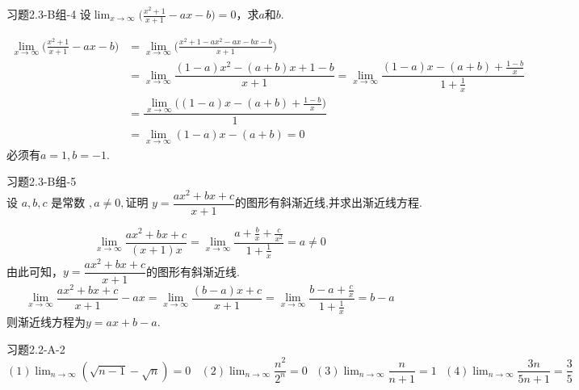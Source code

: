 \begin{example}{习题2.3-B组-4}{}
    设$\displaystyle\lim_{x\to \infty}\bigg(\frac{x^2+1}{x+1}-ax-b\bigg)=0$，求$a$和$b$.
\end{example}
\begin{solution}
    \begin{align*}\displaystyle\lim_{x\to \infty}\bigg(\frac{x^2+1}{x+1}-ax-b\bigg)&=\lim_{x\to \infty}\bigg(\frac{x^2+1-ax^2-ax-bx-b}{x+1}\bigg)\\&=\lim_{x\to \infty}\dfrac{(1-a)x^2-(a+b)x+1-b}{x+1}=\lim_{x\to \infty}\dfrac{(1-a)x-(a+b)+\frac{1-b}{x}}{1+\frac{1}{x}}\\&=\dfrac{\lim_{x\to \infty}\bigg((1-a)x-(a+b)+\frac{1-b}{x}\bigg)}{1}\\&=\lim_{x\to \infty}(1-a)x-(a+b)=0\end{align*}
    必须有$a=1,b=-1$.
\end{solution}
\begin{example}{习题2.3-B组-5}{}
    $\text{设 }a,b,c\text{ 是常数 },a\neq0,\text{证明 }y=\dfrac{ax^{2}+bx+c}{x+1}\text{的图形有斜渐近线,并求出渐近线方程}.$
\end{example}
\begin{solution}
    \[\lim_{x\to \infty}\dfrac{ax^{2}+bx+c}{(x+1)x}=\lim_{x\to \infty}\dfrac{a+\frac{b}{x}+\frac{c}{x^2}}{1+\frac{1}{x}}=a\neq 0\]
    由此可知，$y=\dfrac{ax^{2}+bx+c}{x+1}$的图形有斜渐近线.
    \[\lim_{x\to \infty}\dfrac{ax^{2}+bx+c}{x+1}-ax=\lim_{x\to \infty}\dfrac{(b-a)x+c}{x+1}=\lim_{x\to \infty}\dfrac{b-a+\frac{c}{x}}{1+\frac{1}{x}}=b-a\]则渐近线方程为$y=ax+b-a$.
\end{solution}
\begin{example}{习题2.2-A-2}{}
    $\displaystyle (1)\lim_{n\to\infty}(\sqrt{n-1}-\sqrt{n})=0~~~~(2)\lim_{n\to \infty}\dfrac{n^2}{2^n}=0~~~(3)\lim_{n\to \infty}\dfrac{n}{n+1}=1~~~(4)\lim_{n\to\infty}\dfrac{3n}{5n+1}=\dfrac35$
\end{example}
